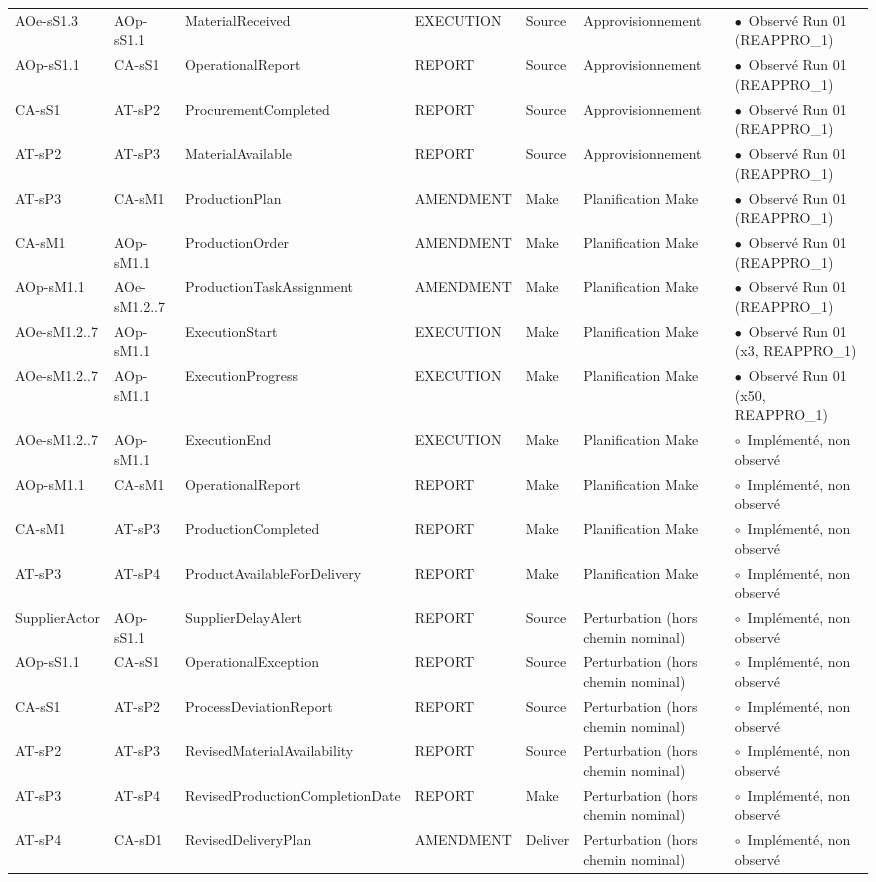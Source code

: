\documentclass[11pt,a4paper]{article}
\newcommand{\stRUN}{\ensuremath{\bullet}~Observé Run 01}
\newcommand{\stIMP}{\ensuremath{\circ}~Implémenté, non observé}
\begin{document}
\begin{landscape}
{\begin{longtable}{p{2.9cm}p{2.9cm}p{5.6cm}p{2.1cm}p{1.4cm}p{2.6cm}p{2.6cm}}
AOe-sS1.3 & AOp-sS1.1 & \mbox{MaterialReceived} & EXECUTION & Source & Approvisionnement & \stRUN{} (REAPPRO\_1) \\
AOp-sS1.1 & CA-sS1 & \mbox{OperationalReport} & REPORT & Source & Approvisionnement & \stRUN{} (REAPPRO\_1) \\
CA-sS1 & AT-sP2 & \mbox{ProcurementCompleted} & REPORT & Source & Approvisionnement & \stRUN{} (REAPPRO\_1) \\
AT-sP2 & AT-sP3 & \mbox{MaterialAvailable} & REPORT & Source & Approvisionnement & \stRUN{} (REAPPRO\_1) \\
AT-sP3 & CA-sM1 & \mbox{ProductionPlan} & AMENDMENT & Make & Planification Make & \stRUN{} (REAPPRO\_1) \\
CA-sM1 & AOp-sM1.1 & \mbox{ProductionOrder} & AMENDMENT & Make & Planification Make & \stRUN{} (REAPPRO\_1) \\
AOp-sM1.1 & AOe-sM1.2..7 & \mbox{ProductionTaskAssignment} & AMENDMENT & Make & Planification Make & \stRUN{} (REAPPRO\_1) \\
AOe-sM1.2..7 & AOp-sM1.1 & \mbox{ExecutionStart} & EXECUTION & Make & Planification Make & \stRUN{} (x3, REAPPRO\_1) \\
AOe-sM1.2..7 & AOp-sM1.1 & \mbox{ExecutionProgress} & EXECUTION & Make & Planification Make & \stRUN{} (x50, REAPPRO\_1) \\
AOe-sM1.2..7 & AOp-sM1.1 & \mbox{ExecutionEnd} & EXECUTION & Make & Planification Make & \stIMP \\
AOp-sM1.1 & CA-sM1 & \mbox{OperationalReport} & REPORT & Make & Planification Make & \stIMP \\
CA-sM1 & AT-sP3 & \mbox{ProductionCompleted} & REPORT & Make & Planification Make & \stIMP \\
AT-sP3 & AT-sP4 & \mbox{ProductAvailableForDelivery} & REPORT & Make & Planification Make & \stIMP \\
SupplierActor & AOp-sS1.1 & \mbox{SupplierDelayAlert} & REPORT & Source & Perturbation (hors chemin nominal) & \stIMP \\
AOp-sS1.1 & CA-sS1 & \mbox{OperationalException} & REPORT & Source & Perturbation (hors chemin nominal) & \stIMP \\
CA-sS1 & AT-sP2 & \mbox{ProcessDeviationReport} & REPORT & Source & Perturbation (hors chemin nominal) & \stIMP \\
AT-sP2 & AT-sP3 & \mbox{RevisedMaterialAvailability} & REPORT & Source & Perturbation (hors chemin nominal) & \stIMP \\
AT-sP3 & AT-sP4 & \mbox{RevisedProductionCompletionDate} & REPORT & Make & Perturbation (hors chemin nominal) & \stIMP \\
AT-sP4 & CA-sD1 & \mbox{RevisedDeliveryPlan} & AMENDMENT & Deliver & Perturbation (hors chemin nominal) & \stIMP \\
\end{longtable}
}
\end{landscape}
\end{document}
